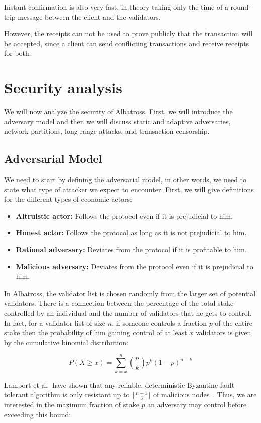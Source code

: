\documentclass[conference]{IEEEtran}
\begin{document}
Instant confirmation is also very fast, in theory taking only the time of a round-trip message between the client and the validators.

However, the receipts can not be used to prove publicly that the transaction will be accepted, since a client can send conflicting transactions and receive receipts for both.

\section{Security analysis}
We will now analyze the security of Albatross. First, we will introduce the adversary model and then we will discuss static and adaptive adversaries, network partitions, long-range attacks, and transaction censorship.

\subsection{Adversarial Model}
We need to start by defining the adversarial model, in other words, we need to state what type of attacker we expect to encounter. First, we will give definitions for the different types of economic actors:

\begin{itemize}
	\item \textbf{Altruistic actor:} Follows the protocol even if it is prejudicial to him.
	\item \textbf{Honest actor:} Follows the protocol as long as it is not prejudicial to him.
	\item \textbf{Rational adversary:} Deviates from the protocol if it is profitable to him.
	\item \textbf{Malicious adversary:} Deviates from the protocol even if it is prejudicial to him.
\end{itemize}

In Albatross, the validator list is chosen randomly from the larger set of potential validators. There is a connection between the percentage of the total stake controlled by an individual and the number of validators that he gets to control. In fact, for a validator list of size $n$, if someone controls a fraction $p$ of the entire stake then the probability of him gaining control of at least $x$ validators is given by the cumulative binomial distribution:

\[ P(X \geq x)= \sum_{k=x}^{n} \binom{n}{k} p^k (1-p)^{n-k} \]

Lamport et al.\ have shown that any reliable, deterministic Byzantine fault tolerant algorithm is only resistant up to $\lfloor \frac{n-1}{3} \rfloor$ of malicious nodes~\cite{lamport1982byzantine}. Thus, we are interested in the maximum fraction of stake $p$ an adversary may control before exceeding this bound:
\end{document}
